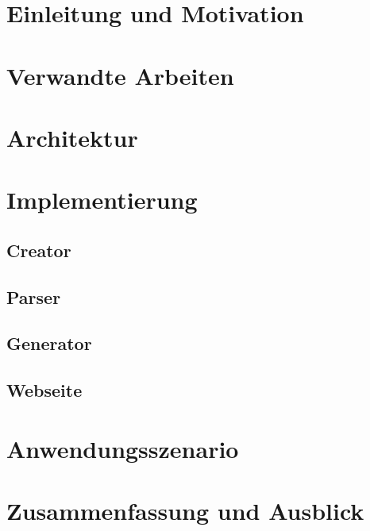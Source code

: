 \documentclass[a4paper,12pt,headsepline,twocolumn]{scrartcl}
\begin{document}
\section{Einleitung und Motivation}


\section{Verwandte Arbeiten}



\section{Architektur}



\section{Implementierung}

\subsection{Creator}



\subsection{Parser}



\subsection{Generator}



\subsection{Webseite}



\section{Anwendungsszenario}


\section{Zusammenfassung und Ausblick}

\end{document}
